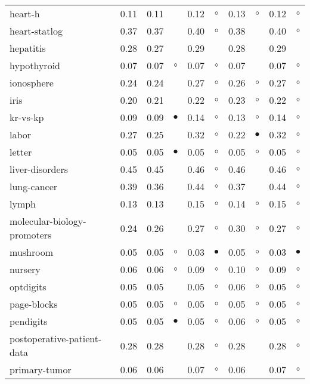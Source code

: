 {\begin{longtable}{lrr@{\hspace{0.1cm}}cr@{\hspace{0.1cm}}cr@{\hspace{0.1cm}}cr@{\hspace{0.1cm}}c}
heart-h & 0.11 & 0.11 &           & 0.12 &   $\circ$ & 0.13 &   $\circ$ & 0.12 &   $\circ$\\
heart-statlog & 0.37 & 0.37 &           & 0.40 &   $\circ$ & 0.38 &           & 0.40 &   $\circ$\\
hepatitis & 0.28 & 0.27 &           & 0.29 &           & 0.28 &           & 0.29 &          \\
hypothyroid & 0.07 & 0.07 &   $\circ$ & 0.07 &   $\circ$ & 0.07 &           & 0.07 &   $\circ$\\
ionosphere & 0.24 & 0.24 &           & 0.27 &   $\circ$ & 0.26 &   $\circ$ & 0.27 &   $\circ$\\
iris & 0.20 & 0.21 &           & 0.22 &   $\circ$ & 0.23 &   $\circ$ & 0.22 &   $\circ$\\
kr-vs-kp & 0.09 & 0.09 & $\bullet$ & 0.14 &   $\circ$ & 0.13 &   $\circ$ & 0.14 &   $\circ$\\
labor & 0.27 & 0.25 &           & 0.32 &   $\circ$ & 0.22 & $\bullet$ & 0.32 &   $\circ$\\
letter & 0.05 & 0.05 & $\bullet$ & 0.05 &   $\circ$ & 0.05 &   $\circ$ & 0.05 &   $\circ$\\
liver-disorders & 0.45 & 0.45 &           & 0.46 &   $\circ$ & 0.46 &           & 0.46 &   $\circ$\\
lung-cancer & 0.39 & 0.36 &           & 0.44 &   $\circ$ & 0.37 &           & 0.44 &   $\circ$\\
lymph & 0.13 & 0.13 &           & 0.15 &   $\circ$ & 0.14 &   $\circ$ & 0.15 &   $\circ$\\
molecular-biology-promoters & 0.24 & 0.26 &           & 0.27 &   $\circ$ & 0.30 &   $\circ$ & 0.27 &   $\circ$\\
mushroom & 0.05 & 0.05 &   $\circ$ & 0.03 & $\bullet$ & 0.05 &   $\circ$ & 0.03 & $\bullet$\\
nursery & 0.06 & 0.06 &   $\circ$ & 0.09 &   $\circ$ & 0.10 &   $\circ$ & 0.09 &   $\circ$\\
optdigits & 0.05 & 0.05 &           & 0.05 &   $\circ$ & 0.06 &   $\circ$ & 0.05 &   $\circ$\\
page-blocks & 0.05 & 0.05 &   $\circ$ & 0.05 &   $\circ$ & 0.05 &   $\circ$ & 0.05 &   $\circ$\\
pendigits & 0.05 & 0.05 & $\bullet$ & 0.05 &   $\circ$ & 0.06 &   $\circ$ & 0.05 &   $\circ$\\
postoperative-patient-data & 0.28 & 0.28 &           & 0.28 &   $\circ$ & 0.28 &           & 0.28 &   $\circ$\\
primary-tumor & 0.06 & 0.06 &           & 0.07 &   $\circ$ & 0.06 &           & 0.07 &   $\circ$\\

\end{longtable}}
